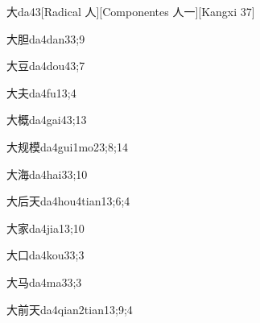 \begin{verbete}{大}{da4}{3}[Radical ⼈][Componentes ⼈⼀][Kangxi 37]
\end{verbete}

\begin{verbete}{大胆}{da4dan3}{3;9}
\end{verbete}

\begin{verbete}{大豆}{da4dou4}{3;7}
\end{verbete}

\begin{verbete}{大夫}{da4fu1}{3;4}
\end{verbete}

\begin{verbete}{大概}{da4gai4}{3;13}
\end{verbete}

\begin{verbete}{大规模}{da4gui1mo2}{3;8;14}
\end{verbete}

\begin{verbete}{大海}{da4hai3}{3;10}
\end{verbete}

\begin{verbete}{大后天}{da4hou4tian1}{3;6;4}
\end{verbete}

\begin{verbete}{大家}{da4jia1}{3;10}
\end{verbete}

\begin{verbete}{大口}{da4kou3}{3;3}
\end{verbete}

\begin{verbete}{大马}{da4ma3}{3;3}
\end{verbete}

\begin{verbete}{大前天}{da4qian2tian1}{3;9;4}
\end{verbete}

